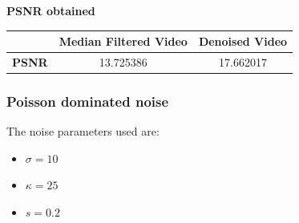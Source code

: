 \documentclass{article}
\begin{document}
\textbf{PSNR obtained}
\begin{table}[H]
    \begin{tabular}{|c|c|c|}
    \hline
    \textbf{}     & Median Filtered Video & Denoised Video   \\
    \hline
    \textbf{PSNR} & 13.725386             & 17.662017      \\ 
    \hline
    \end{tabular}
    \end{table}

\newpage
\subsubsection*{Poisson dominated noise}
The noise parameters used are: \\
\begin{itemize}
    \item $\sigma = 10$
    \item $\kappa = 25$
    \item $s = 0.2$
\end{itemize}
\end{document}
